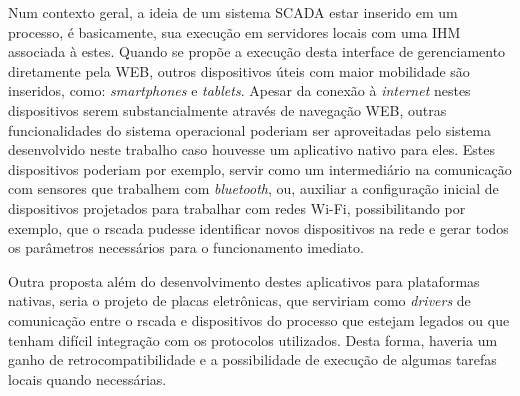 Num contexto geral, a ideia de um sistema \gls{SCADA} estar inserido em um processo, é basicamente, sua execução em servidores locais com uma \gls{IHM} associada à estes. Quando se propõe a execução desta interface de gerenciamento diretamente pela \gls{WEB}, outros dispositivos úteis com maior mobilidade são inseridos, como: \textit{smartphones} e \textit{tablets}. Apesar da conexão à \textit{internet} nestes dispositivos serem substancialmente através de navegação \gls{WEB}, outras funcionalidades do sistema operacional poderiam ser aproveitadas pelo sistema desenvolvido neste trabalho caso houvesse um aplicativo nativo para eles. Estes dispositivos poderiam por exemplo, servir como um intermediário na comunicação com sensores que trabalhem com \textit{bluetooth}, ou, auxiliar a configuração inicial de dispositivos projetados para trabalhar com redes Wi-Fi, possibilitando por exemplo, que o rscada pudesse identificar novos dispositivos na rede e gerar todos os parâmetros necessários para o funcionamento imediato.

Outra proposta além do desenvolvimento destes aplicativos para plataformas nativas, seria o projeto de placas eletrônicas, que serviriam como \textit{drivers} de comunicação entre o rscada e dispositivos do processo que estejam legados ou que tenham difícil integração com os protocolos utilizados. Desta forma, haveria um ganho de retrocompatibilidade e a possibilidade de execução de algumas tarefas locais quando necessárias.
